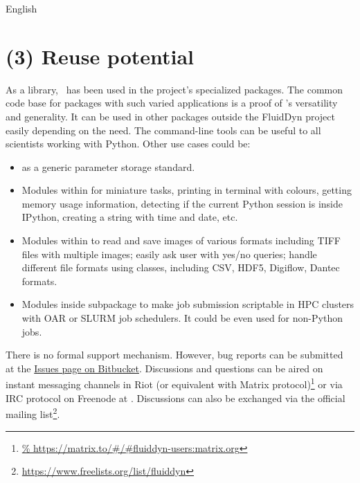 \documentclass{../jors}
\begin{document}

English

\section*{(3) Reuse potential}
%
%

As a library, \fluiddyn\ has been used in the project's specialized packages.
The common code base for packages with such varied applications is a proof of
\fluiddyn's versatility and generality. It can be used in other packages outside
the FluidDyn project easily depending on the need. The command-line tools can
be useful to all scientists working with Python. Other use cases could be:
\begin{itemize}
	\item {} as a generic parameter storage
		standard.
	\item Modules within  for miniature tasks,
		printing in terminal with colours, getting memory usage
		information, detecting if the current Python session is inside
		IPython, creating a string with time and date, etc.
	\item Modules within  to read
		and save images of various formats including TIFF files with
		multiple images; easily ask user with yes/no queries; handle
		different file formats using classes, including CSV, HDF5,
		Digiflow, Dantec formats.
	\item Modules inside  subpackage to
		make job submission scriptable in HPC clusters with OAR or
		SLURM job schedulers. It could be even used for non-Python
		jobs.
\end{itemize}


There is no formal support mechanism. However, bug reports can be submitted at the
\href{https://bitbucket.org/fluiddyn/fluiddyn/issues}{Issues page on Bitbucket}.
Discussions and questions can be aired on instant messaging channels in Riot (or
equivalent with Matrix protocol)\footnote{
\url{%
  https://matrix.to/\#/\#fluiddyn-users:matrix.org}}
or via IRC protocol on Freenode at . Discussions
can also be exchanged via the official mailing list\footnote{
\url{https://www.freelists.org/list/fluiddyn}}.
\end{document}
